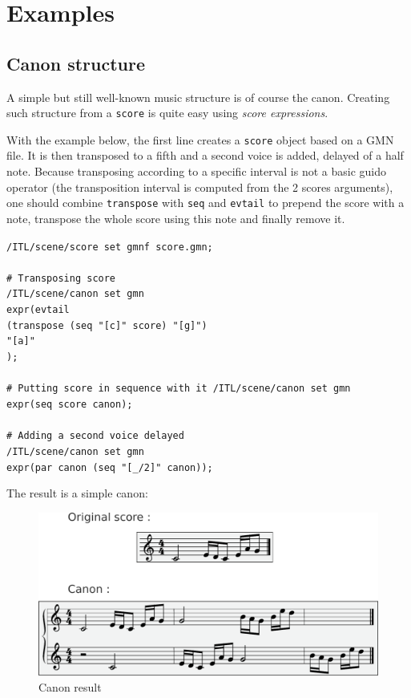 \documentclass{article}
\newcommand{\OSC}[1]{\texttt{#1}}
\newcommand{\sExpr}{\emph{score expressions}}
\newcommand{\tab}{\hspace*{4mm}}
\newcommand{\sample}	[1]			{\vspace{-0.2em}\begin{center}\colorbox{mygrey}{\begin{minipage}[t]{0.95\columnwidth} {\small \texttt{#1}}\end{minipage}}\end{center}}
\begin{document}
\section{Examples}
\label{examples}

\subsection{Canon structure}

A simple but still well-known music structure is of course the canon. Creating such structure from a \OSC{score} is quite easy using \sExpr.

With the example below, the first line creates a \OSC{score} object based on a GMN file. It is then transposed to a fifth and a second voice is added, delayed of a half note. Because transposing according to a specific interval is not a basic guido operator (the transposition interval is computed from the 2 scores arguments), one should combine \OSC{transpose} with \OSC{seq} and \OSC{evtail} to prepend the score with a note, transpose the whole score using this note and finally remove it.

\sample{/ITL/scene/score set gmnf score.gmn;\\
\\
\# Transposing score\\
/ITL/scene/canon set gmn\\
\tab expr(evtail\\
\tab\tab(transpose (seq "[c]" score) "[g]")\\
\tab\tab"[a]"\\
\tab);\\
\\
\# Putting score in sequence with it
/ITL/scene/canon set gmn\\
\tab expr(seq score canon);\\
\\
\# Adding a second voice delayed\\
/ITL/scene/canon set gmn\\
\tab expr(par canon (seq "[\_/2]" canon));
}

The result is a simple canon:
\begin{figure}[th]
\centering
\includegraphics[width=1.\columnwidth]{imgs/exampleCanon}
\caption{Canon result
\label{fig:canonFig}}
\end{figure}
\end{document}
